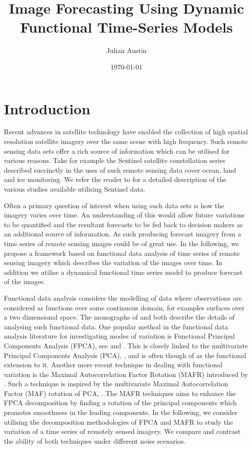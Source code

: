 \documentclass{article}
\title{Image Forecasting Using Dynamic Functional Time-Series Models}
\author{Julian Austin}
\date\today
\begin{document}
\maketitle
\section{\label{sec:intro}Introduction}
Recent advances in satellite technology have enabled the collection of high spatial resolution satellite imagery over the same scene with high frequency. Such remote sensing data sets offer a rich source of information which can be utilised for various reasons. Take for example the Sentinel satellite constellation series described succinctly in \citet{aschbacher_european_2012} the uses of such remote sensing data cover ocean, land and ice monitoring. We refer the reader to \citet{malenovsky_sentinels_2012} for a detailed description of the various studies available utilising Sentinel data. 

Often a primary question of interest when using such data sets is how the imagery varies over time. An understanding of this would allow future variations to be quantified and the resultant forecasts to be fed back to decision makers as an additional source of information. As such producing forecast imagery from a time series of remote sensing images could be of great use. In the following, we propose a framework based on functional data analysis of time series of remote sensing imagery which describes the variation of the images over time. In addition we utilise a dynamical functional time series model to produce forecast of the images.

Functional data analysis considers the modelling of data where observations are considered as functions over some continuous domain; for examples surfaces over a two dimensional space. The monographs of \citet{ramsay_functional_2010} and \citet{wang_functional_2016} both describe the details of analysing such functional data. One popular method in the functional data analysis literature for investigating modes of variation is Functional Principal Components Analysis (FPCA), see \citet{ramsay_functional_2010} and \citet{yao_functional_2005}. This is closely linked to the multivariate Principal Components Analysis (PCA), \cite{jolliffe_principal_2002},  and is often though of as the functional extension to it. Another more recent technique in dealing with functional variation is the Maximal Autocorrelation Factor Rotation (MAFR) introduced by \citet{hooker_maximal_2016}. Such a technique is inspired by the multivariate Maximal Autocorrelation Factor (MAF) rotation of PCA, \cite{switzer_minmax_1984}. The MAFR techniques aims to enhance the FPCA decomposition by finding a rotation of the principal components which promotes smoothness in the leading components. In the following, we consider utilising the decomposition methodologies of FPCA and MAFR to study the variation of a time series of remotely sensed imagery. We compare and contrast the ability of both techniques under different noise scenarios. 
\end{document}
